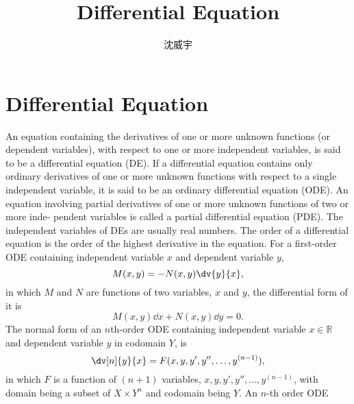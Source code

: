 \documentclass[a4paper,12pt]{report}
\begin{document}
\title{Differential Equation}
\author{沈威宇}
\date{\temtoday}
\titletocdoc
\chapter{Differential Equation}
An equation containing the derivatives of one or more unknown functions (or
dependent variables), with respect to one or more independent variables, is
said to be a differential equation (DE).
If a differential equation contains only ordinary
derivatives of one or more unknown functions with respect to a single independent
variable, it is said to be an ordinary differential equation (ODE). An equation
involving partial derivatives of one or more unknown functions of two or more inde-
pendent variables is called a partial differential equation (PDE). The independent variables of DEs are usually real numbers.
The order of a differential equation is the order of the highest derivative in the equation.
For a first-order ODE containing independent variable $x$ and dependent variable $y$,
\[M(x,y)=-N(x,y)\dv{y}{x},\]
in which $M$ and $N$ are functions of two variables, $x$ and $y$, the differential form of it is
\[M(x,y)\dd{x}+N(x,y)\dd{y}=0.\]
The normal form of an $n$th-order ODE containing independent variable $x\in\mathbb{R}$ and dependent variable $y$ in codomain $Y$, is
\[\dv[n]{y}{x}=F(x,y,y',y'',\ldots,y^{(n-1)}),\]
in which $F$ is a function of $(n+1)$ variables, $x,y,y',y'',\ldots,y^{(n-1)}$, with domain being a subset of $X\times Y^n$ and codomain being $Y$.
An $n$-th order ODE
\end{document}
